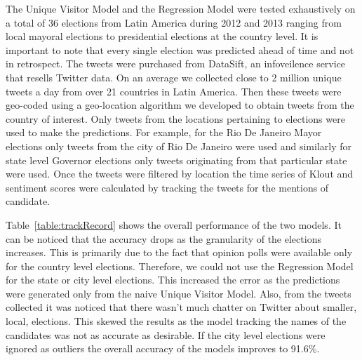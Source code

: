 The Unique Visitor Model and the Regression Model were tested exhaustively on a total of 36 elections from Latin America during 2012 and 2013 ranging from local mayoral elections to presidential elections at the country level.
It is important to note that every single election was predicted ahead of time and not in retrospect.
The tweets were purchased from DataSift, an infoveilence service that resells Twitter data.
On an average we collected close to 2 million unique tweets a day from over 21 countries in Latin America.
Then these tweets were geo-coded using a geo-location algorithm we developed to obtain tweets from the country of interest.
Only tweets from the locations pertaining to elections were used to make the predictions.
For example, for the Rio De Janeiro Mayor elections only tweets from the city of Rio De Janeiro were used and similarly for state level Governor elections only tweets originating from that particular state were used.
Once the tweets were filtered by location the time series of Klout and sentiment scores were calculated by tracking the tweets for the mentions of candidate.

Table~\ref{table:trackRecord} shows the overall performance of the two models. 
It can be noticed that the accuracy drops as the granularity of the elections increases. 
This is primarily due to the fact that opinion polls were available only for the country level elections.
Therefore, we could not use the Regression Model for the state or city level elections.
This increased the error as the predictions were generated only from the naive Unique Visitor Model.
Also, from the tweets collected it was noticed that there wasn't much chatter on Twitter about 
smaller, local, elections.
This skewed the results as the model tracking the names of the candidates was not as accurate as desirable.
If the city level elections were ignored as outliers the overall accuracy of the models improves to 91.6\%.
